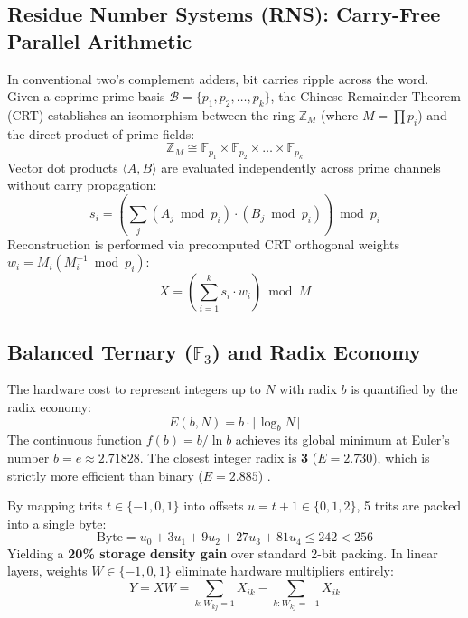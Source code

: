 \documentclass[11pt,a4paper]{article}
\begin{document}
\subsection{Residue Number Systems (RNS): Carry-Free Parallel Arithmetic}
In conventional two's complement adders, bit carries ripple across the word. Given a coprime prime basis $\mathcal{B} = \{p_1, p_2, \dots, p_k\}$, the Chinese Remainder Theorem (CRT) establishes an isomorphism between the ring $\mathbb{Z}_M$ (where $M = \prod p_i$) and the direct product of prime fields:
\begin{equation}
\mathbb{Z}_M \cong \mathbb{F}_{p_1} \times \mathbb{F}_{p_2} \times \dots \times \mathbb{F}_{p_k}
\end{equation}
Vector dot products $\langle A, B \rangle$ are evaluated independently across prime channels without carry propagation:
\begin{equation}
s_i = \left( \sum_{j} (A_j \bmod p_i) \cdot (B_j \bmod p_i) \right) \bmod p_i
\end{equation}
Reconstruction is performed via precomputed CRT orthogonal weights $w_i = M_i (M_i^{-1} \bmod p_i)$:
\begin{equation}
X = \left( \sum_{i=1}^k s_i \cdot w_i \right) \bmod M
\end{equation}

\subsection{Balanced Ternary (\texorpdfstring{$\mathbb{F}_3$}{F3}) and Radix Economy}
The hardware cost to represent integers up to $N$ with radix $b$ is quantified by the radix economy:
\begin{equation}
E(b, N) = b \cdot \lceil \log_b N \rceil
\end{equation}
The continuous function $f(b) = b / \ln b$ achieves its global minimum at Euler's number $b = e \approx 2.71828$. The closest integer radix is \textbf{3} ($E=2.730$), which is strictly more efficient than binary ($E=2.885$) \cite{hayes2001third}.

By mapping trits $t \in \{-1, 0, 1\}$ into offsets $u = t + 1 \in \{0, 1, 2\}$, 5 trits are packed into a single byte:
\begin{equation}
\text{Byte} = u_0 + 3 u_1 + 9 u_2 + 27 u_3 + 81 u_4 \le 242 < 256
\end{equation}
Yielding a \textbf{20\% storage density gain} over standard 2-bit packing. In linear layers, weights $W \in \{-1, 0, 1\}$ eliminate hardware multipliers entirely:
\begin{equation}
Y = X W = \sum_{k: W_{kj}=1} X_{ik} - \sum_{k: W_{kj}=-1} X_{ik}
\end{equation}
\end{document}
